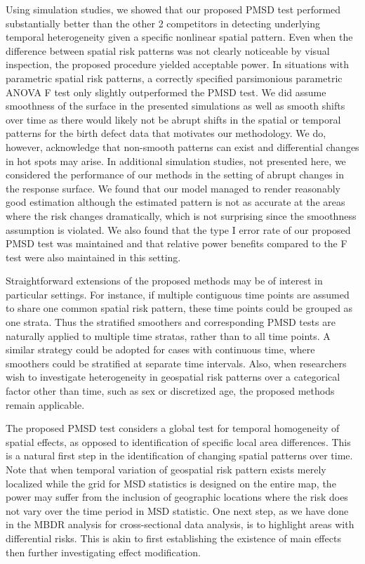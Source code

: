 	Using simulation studies, we showed that our proposed PMSD test performed substantially better than the other 2 competitors in detecting underlying temporal heterogeneity given a specific nonlinear spatial pattern. Even when the difference between spatial risk patterns was not clearly noticeable by visual inspection, the proposed procedure yielded acceptable power. In situations with parametric spatial risk patterns, a correctly specified parsimonious parametric ANOVA F test only slightly outperformed the PMSD test. We did assume smoothness of the surface in the presented simulations as well as smooth shifts over time as there would likely not be abrupt shifts in the spatial or temporal patterns for the birth defect data that motivates our methodology.  We do, however, acknowledge that non-smooth patterns can exist and differential changes in hot spots may arise. In additional simulation studies, not presented here, we considered the performance of our methods in the setting of abrupt changes in the response surface. We found that our model managed to render reasonably good estimation although the estimated pattern is not as accurate at the areas where the risk changes dramatically, which is not surprising since the smoothness assumption is violated. We also found that the type I error rate of our proposed PMSD test was maintained and that relative power benefits compared to the F test were also maintained in this setting. 
	
	Straightforward extensions of the proposed methods may be of interest in particular settings. For instance, if multiple contiguous time points are assumed to share one common spatial risk pattern, these time points could be grouped as one strata. Thus the stratified smoothers and corresponding PMSD tests are naturally applied to multiple time stratas, rather than to all time points. A similar strategy could be adopted for cases with continuous time, where smoothers could be stratified at separate time intervals. Also, when researchers wish to investigate heterogeneity in geospatial risk patterns over a categorical factor other than time, such as sex or discretized age, the proposed methods remain applicable. 
	
	The proposed PMSD test considers a global test for temporal homogeneity of spatial effects, as opposed to identification of specific local area differences. This is a natural first step in the identification of changing spatial patterns over time. Note that when temporal variation of geospatial risk pattern exists merely localized while the grid for MSD statistics is designed on the entire map, the power may suffer from the inclusion of geographic locations where the risk does not vary over the time period in MSD statistic. One next step, as we have done in the MBDR analysis for cross-sectional data analysis, is to highlight areas with differential risks. This is akin to first establishing the existence of main effects then further investigating effect modification. 
	
